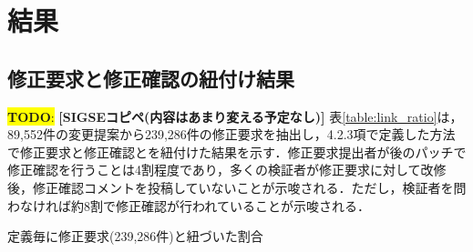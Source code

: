 \documentclass[11pt]{jreport}
\newcommand{\todo}[1]{\colorbox{yellow}{{\bf TODO}:}{\color{red} {\textbf{[#1]}}}}
\begin{document}
\section{結果}
\subsection{修正要求と修正確認の紐付け結果}
\todo{SIGSEコピペ(内容はあまり変える予定なし)}
表\ref{table:link_ratio}は，89,552件の変更提案から239,286件の修正要求を抽出し，4.2.3項で定義した方法で修正要求と修正確認とを紐付けた結果を示す．修正要求提出者が後のパッチで修正確認を行うことは4割程度であり，多くの検証者が修正要求に対して改修後，修正確認コメントを投稿していないことが示唆される．ただし，検証者を問わなければ約8割で修正確認が行われていることが示唆される．

\begin{table}[t]
\centering
  \caption{定義毎に修正要求(239,286件)と紐づいた割合}
  \label{table:link_ratio}
\centering
  \caption{プロジェクト毎の1日あたりの変更提案数と修正要求数の分布}
  \label{table:Mann-White}
\end{table}
\end{document}
